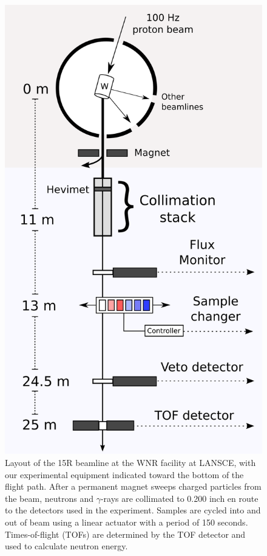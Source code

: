 \begin{figure}[tb]
    \centering
    \includegraphics[height=0.7\textheight]{figures/ExperimentalSetup.png}
    \caption[Layout of the 15R beamline at the WNR facility at LANSCE]
    {Layout of the 15R beamline at the WNR facility at LANSCE, with our
        experimental equipment indicated toward the bottom of the flight path.
        After a permanent magnet sweeps charged particles from the beam, neutrons and
        $\gamma$-rays are collimated to 0.200 inch en route to the
        detectors used in the experiment. Samples are cycled into and out of beam
        using a linear actuator with a period of 150 seconds. Times-of-flight (TOFs) are
        determined by the TOF detector and used to calculate neutron energy.
    }
    \label{ExperimentalApparatus}
\end{figure}
